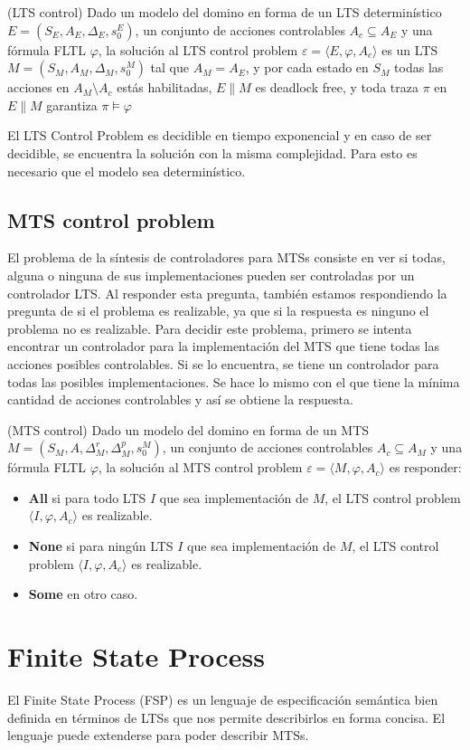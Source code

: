 \begin{definition}{(LTS control)}
Dado un modelo del domino en forma de un LTS determinístico $E = (S_{E}, A_{E}, \Delta_{E}, s_{0}^{E})$, un conjunto de 
acciones controlables $A_{c} \subseteq A_{E}$ y una fórmula FLTL $\varphi$, la solución al LTS control problem 
$\varepsilon = \langle E, \varphi, A_{c} \rangle$ es un LTS $M = (S_{M}, A_{M}, \Delta_{M}, s_{0}^{M})$ tal que 
$A_{M} = A_{E}$, y por cada estado en $S_{M}$ todas las acciones en $A_{M} \setminus A_{c}$ estás habilitadas, $E \parallel M$ 
es deadlock free, y toda traza $\pi$ en $E \parallel M$ garantiza $\pi \vDash \varphi$
\end{definition}

El LTS Control Problem es decidible en tiempo exponencial y en caso de ser decidible, se encuentra la solución con la 
misma complejidad. Para esto es necesario que el modelo sea determinístico.

\subsection{MTS	control problem}

El problema de la síntesis de controladores para MTSs \cite{MTSControl} consiste en ver si todas, alguna o ninguna de sus 
implementaciones pueden ser controladas por un controlador LTS. Al responder esta pregunta, también estamos respondiendo 
la pregunta de si el problema es realizable, ya que si la respuesta es ninguno el problema no es realizable. Para decidir 
este problema, primero se intenta encontrar un controlador para la implementación del MTS que tiene todas las acciones 
posibles controlables. Si se lo encuentra, se tiene un controlador para todas las posibles implementaciones. Se hace lo 
mismo con el que tiene la mínima cantidad de acciones controlables y así se obtiene la respuesta.

\begin{definition}{(MTS control)}
Dado un modelo del domino en forma de un MTS $M = (S_{M}, A, \Delta_{M}^{r}, \Delta_{M}^{p}, s_{0}^{M})$, un conjunto de 
acciones controlables $A_{c} \subseteq A_{M}$ y una fórmula FLTL $\varphi$, la solución al MTS control problem 
$\varepsilon = \langle M, \varphi, A_{c} \rangle$ es responder:

\begin{itemize}

\item
\textbf{All} si para todo LTS $I$ que sea implementación de $M$, el LTS control problem $\langle I, \varphi, A_{c} \rangle$ es realizable.

\item
\textbf{None} si para ningún LTS $I$ que sea implementación de $M$, el LTS control problem $\langle I, \varphi, A_{c} \rangle$ es realizable.

\item
\textbf{Some} en otro caso.

\end{itemize}

\end{definition}

\section{Finite State Process}
El Finite State Process (FSP) \cite{FSP} es un lenguaje de especificación semántica bien definida en términos de LTSs que nos permite describirlos 
en forma concisa. El lenguaje puede extenderse para poder describir MTSs.